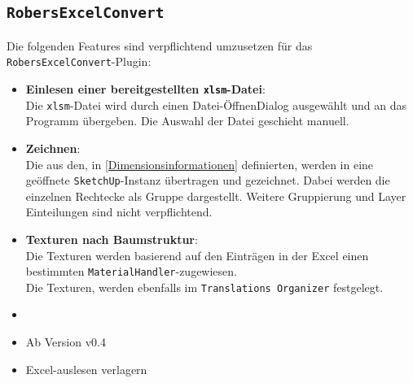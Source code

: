 \documentclass[a4paper,12pt]{article}
\newcommand{\robersexcelconvert}{\texttt{RobersExcelConvert}\xspace}
\newcommand{\assisttool}{\texttt{Translations Organizer}}
\newcommand{\sketchup}{\texttt{SketchUp}\xspace}
\begin{document}
		\subsection{\robersexcelconvert} \label{Pflichten-Nehmer-main}
			Die folgenden Features sind verpflichtend umzusetzen für das \robersexcelconvert-Plugin:
			\begin{itemize}
				\item \textbf{Einlesen einer bereitgestellten \texttt{xlsm}-Datei}:\label{Dimensionsinformationen}\\ %
					Die \texttt{xlsm}-Datei wird durch einen Datei-ÖffnenDialog ausgewählt und an das Programm übergeben. Die Auswahl der Datei geschieht manuell.
				\item \textbf{Zeichnen}: \label{zeichnen}\\
					Die aus den, in \ref{Dimensionsinformationen} definierten, werden in eine geöffnete \sketchup-Instanz übertragen und gezeichnet. Dabei werden die einzelnen Rechtecke als Gruppe dargestellt. Weitere Gruppierung und Layer Einteilungen sind nicht verpflichtend.
				\item \textbf{Texturen nach Baumstruktur}: \label{texturen}\\
					Die Texturen werden basierend auf den Einträgen in der Excel einen bestimmten \texttt{MaterialHandler}-zugewiesen.\\ Die Texturen, werden ebenfalls im \assisttool\xspace festgelegt.
				\item[]
				\item[] Ab Version v0.4
				\item Excel-auslesen verlagern
			\end{itemize}
\end{document}
